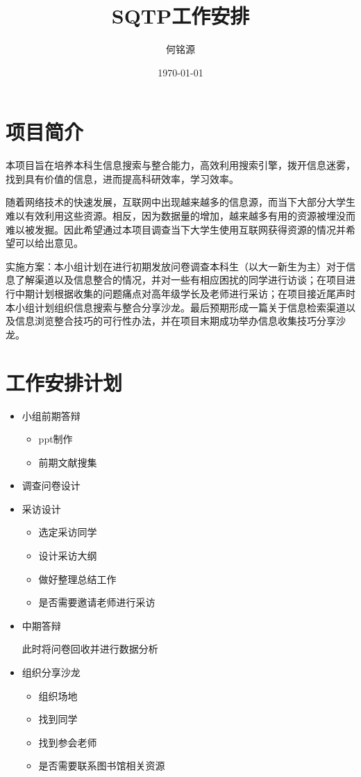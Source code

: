 \documentclass{ctexart}
\title{SQTP工作安排}
\author{何铭源}
\date{\today}
\begin{document}
\maketitle
\tableofcontents
\section{项目简介}
本项目旨在培养本科生信息搜索与整合能力，高效利用搜索引擎，拨开信息迷雾，找到具有价值的信息，进而提高科研效率，学习效率。

随着网络技术的快速发展，互联网中出现越来越多的信息源，而当下大部分大学生难以有效利用这些资源。相反，因为数据量的增加，越来越多有用的资源被埋没而难以被发掘。因此希望通过本项目调查当下大学生使用互联网获得资源的情况并希望可以给出意见。

实施方案：本小组计划在进行初期发放问卷调查本科生（以大一新生为主）对于信息了解渠道以及信息整合的情况，并对一些有相应困扰的同学进行访谈；在项目进行中期计划根据收集的问题痛点对高年级学长及老师进行采访；在项目接近尾声时本小组计划组织信息搜索与整合分享沙龙。最后预期形成一篇关于信息检索渠道以及信息浏览整合技巧的可行性办法，并在项目末期成功举办信息收集技巧分享沙龙。
\section{工作安排计划}
\begin{itemize}
    \item 小组前期答辩
    \begin{itemize}
        \item ppt制作
        \item 前期文献搜集
    \end{itemize}
    \item 调查问卷设计
    \item 采访设计
    \begin{itemize}
        \item 选定采访同学
        \item 设计采访大纲
        \item 做好整理总结工作
        \item 是否需要邀请老师进行采访
    \end{itemize}
    \item 中期答辩\par
        此时将问卷回收并进行数据分析
    \item 组织分享沙龙
    \begin{itemize}
        \item 组织场地
        \item 找到同学
        \item 找到参会老师
        \item 是否需要联系图书馆相关资源
    \end{itemize}
\end{itemize}
\end{document}
